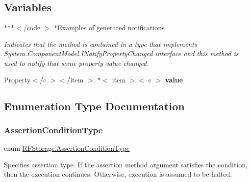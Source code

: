 \subsection*{Variables}
\begin{DoxyCompactItemize}
\item 
$\ast$$\ast$$\ast$$<$/code $>$ $\ast$Examples of generated \mbox{\hyperlink{namespace_r_f_storage_a241376644238295cf61a8cc4cc3f7934}{notifications}}
\begin{DoxyCompactList}\small\item\em Indicates that the method is contained in a type that implements {\ttfamily System.\+Component\+Model.\+I\+Notify\+Property\+Changed} interface and this method is used to notify that some property value changed. \end{DoxyCompactList}\item 
\mbox{\label{namespace_r_f_storage_a1f55119c768ee07a0db3e88673bc1728}} 
Property$<$/c $>$$<$/item $>$ $\ast$$<$ item $>$$<$ c $>$ {\bfseries value}
\end{DoxyCompactItemize}


\subsection{Enumeration Type Documentation}
\mbox{\label{namespace_r_f_storage_adc57200f58df721ce95677742004e92a}} 
\subsubsection{\texorpdfstring{AssertionConditionType}{AssertionConditionType}}
{\footnotesize\ttfamily enum \mbox{\hyperlink{namespace_r_f_storage_adc57200f58df721ce95677742004e92a}{R\+F\+Storage.\+Assertion\+Condition\+Type}}\hspace{0.3cm}{\ttfamily [strong]}}



Specifies assertion type. If the assertion method argument satisfies the condition, then the execution continues. Otherwise, execution is assumed to be halted. 

